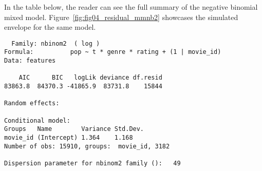 In the table below, the reader can see the full summary of the negative binomial
mixed model. Figure~\ref{fig:fig04_residual_mmnb2} showcases the simulated
envelope for the same model.

\begin{verbatim}
  Family: nbinom2  ( log )
Formula:          pop ~ t * genre * rating + (1 | movie_id)
Data: features

    AIC      BIC   logLik deviance df.resid
83863.8  84370.3 -41865.9  83731.8    15844

Random effects:

Conditional model:
Groups   Name        Variance Std.Dev.
movie_id (Intercept) 1.364    1.168
Number of obs: 15910, groups:  movie_id, 3182

Dispersion parameter for nbinom2 family ():   49


\end{verbatim}
